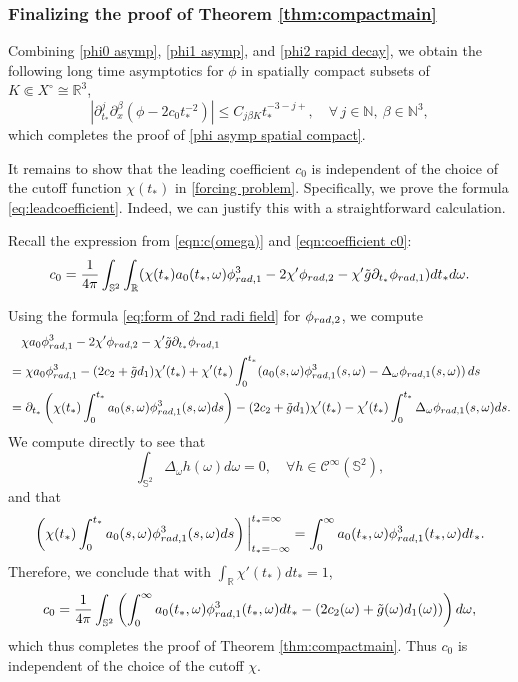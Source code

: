 \documentclass[10pt,a4paper,reqno]{amsart}
\newcommand{\CI}{\mathcal{C}^\infty}
\newcommand{\RR}{\mathbb{R}}
\newcommand{\pa}{\partial}
\newcommand{\ti}{\tilde}
\renewcommand{\S}{{\mathbb S}}
\theoremstyle{definition}
\theoremstyle{remark}
\numberwithin{equation}{section}
\newcommand{\R}{\mathbb R}
\newcommand{\ts}{t_*}
\begin{document}
\subsubsection{Finalizing the proof of Theorem \ref{thm:compactmain}}
Combining \eqref{phi0 asymp}, \eqref{phi1 asymp}, and \eqref{phi2 rapid decay}, we obtain the following long time asymptotics for $\phi$ in spatially compact subsets of $K\Subset X^\circ \cong \R^3$,
\begin{equation*}
    |\pa_{\ts}^j \pa_x^\beta (\phi - 2c_0 t_*^{-2})|\leq C_{j\beta K} t_*^{-3-j+},\quad \forall\, j\in\mathbb{N},\ \beta\in\mathbb{N}^3,
\end{equation*}
which completes the proof of \eqref{phi asymp spatial compact}. 

It remains to show that the leading coefficient $c_0$ is independent of the choice of the cutoff function $\chi(\ts)$ in \eqref{forcing problem}. Specifically, we prove the formula \eqref{eq:leadcoefficient}. 
Indeed, we can justify this with a straightforward calculation.

Recall the expression from \eqref{eqn:c(omega)} and \eqref{eqn:coefficient c0}: 
\begin{equation}
c_0 = \frac{1}{4\pi} \int_{\S^2} \int_\RR (\chi(t_*) a_0(\ts,\omega) \phi_{\rm rad,1}^3 - 2\chi' \phi_{\rm{rad},2} - \chi' \ti{g} \pa_{\ts}\phi_{\rm{rad},1}) d\ts d\omega.
\label{eq:c0 again}
\end{equation}  




Using the formula \eqref{eq:form of 2nd radi field} for $\phi_{\rm rad,2}$, we compute
\[
\begin{split}
    { }&\quad\chi a_0 \phi_{\rm rad,1}^3 - 2\chi' \phi_{\rm{rad},2} - \chi' \ti{g} \pa_{\ts}\phi_{\rm{rad},1} \\
    &= \chi a_0 \phi_{\rm{rad},1}^3 - (2c_2+\ti{g}d_1)\chi'(\ts)  + \chi'(\ts) \int_0^{\ts} (a_0(s,\omega)\phi_{\rm{rad},1}^3(s,\omega) -\Delta_\omega\phi_{\rm{rad},1}(s,\omega) )\,ds \\
    &= \pa_{\ts} \left( \chi(\ts) \int_0^{\ts} a_0(s,\omega) \phi_{\rm{rad},1}^3(s,\omega) ds \right)  -(2c_2+\ti{g}d_1)\chi'(\ts)  - \chi'(\ts)\int_0^{\ts} \Delta_\omega\phi_{\rm{rad},1}(s,\omega) ds.
\end{split}
\]
We compute directly to see that 
\[
	\int_{\S^2} \Delta_\omega h(\omega) d\omega=0,\quad\forall h\in\CI(\S^2),
\]
and that 
\[
	\left(\chi(\ts) \int_0^{\ts} a_0(s,\omega)\phi_{\rm{rad},1}^3(s,\omega) ds\right)\bigg\lvert_{\ts=-\infty}^{\ts=\infty} = \int_0^\infty a_0(\ts,\omega)\phi_{\rm{rad},1}^3(\ts,\omega) d\ts.
\]
Therefore, we conclude that with $\int_{\R} \chi'(\ts) d\ts = 1$,
\begin{equation}
	c_0 = \frac{1}{4\pi} \int_{\S^2}  \left( \int_0^\infty a_0(\ts,\omega)\phi_{\rm{rad},1}^3(\ts,\omega) d\ts -  (2c_2(\omega)+\ti{g}(\omega)d_1(\omega))\right) d\omega,
\label{eq:c0final}
\end{equation}
which thus completes the proof of Theorem \ref{thm:compactmain}. Thus $c_0$ is independent of the choice of the cutoff $\chi$. 
\end{document}
